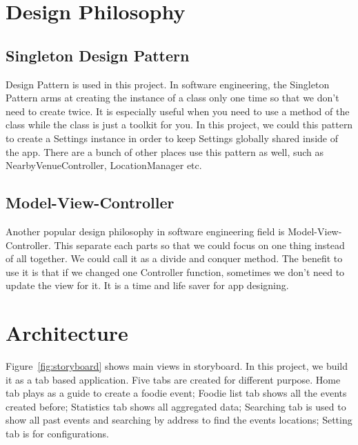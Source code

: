 \section{Design Philosophy} %
\label{sec:design_pholosiphy}

\subsection{Singleton Design Pattern} %
\label{sub:singleton_design_pattern}

	Design Pattern is used in this project. In software engineering, the Singleton Pattern arms at creating the instance of a class only one time so that we don't need to create twice. It is especially useful when you need to use a method of the class while the class is just a toolkit for you. In this project, we could this pattern to create a Settings instance in order to keep Settings globally shared inside of the app. There are a bunch of other places use this pattern as well, such as NearbyVenueController, LocationManager etc. \\
	

\subsection{Model-View-Controller} %
\label{sub:model_view_controller}

	Another popular design philosophy in software engineering field is Model-View-Controller. This separate each parts so that we could focus on one thing instead of all together. We could call it as a divide and conquer method. The benefit to use it is that if we changed one Controller function, sometimes we don't need to update the view for it. It is a time and life saver for app designing. \\
	
\newpage
\section{Architecture} %
\label{sec:architecture}

	Figure~\ref{fig:storyboard} shows main views in storyboard. In this project, we build it as a tab based application. Five tabs are created for different purpose. Home tab plays as a guide to create a foodie event; Foodie list tab shows all the events created before; Statistics tab shows all aggregated data; Searching tab is used to show all past events and searching by address to find the events locations; Setting tab is for configurations.
	
